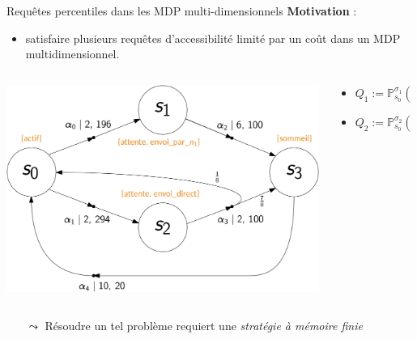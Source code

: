 \documentclass[compress]{beamer}
\begin{document}
\begin{frame}{Requêtes percentiles dans les MDP multi-dimensionnels}
  \textbf{\color{fibeamer@orange}Motivation} :
  \begin{itemize}
    \item satisfaire plusieurs requêtes d'accessibilité limité par un coût dans
      un MDP multidimensionnel.
  \end{itemize}
  \begin{center}
    \begin{columns}
      \begin{column}{0.4\linewidth}
        \includegraphics[width=\linewidth]{resources/mdmdp2}
      \end{column}
      \begin{column}{0.6\linewidth}{\small
        \begin{itemize}
          \item $Q_1 := \mathbb{P}^{\sigma_1}_{s_0}(\Diamond_{1\, :\, \leq 4} \text{ sommeil}) \geq 0.8$
          \item $Q_2 := \mathbb{P}^{\sigma_2}_{s_0}(\Diamond_{2\, :\, \leq 700} \text{ sommeil}) \geq 0.9$
        \end{itemize}
        }
      \end{column}
    \end{columns}
  \end{center}
  \begin{itemize}
    \item[$\leadsto$] Résoudre un tel problème requiert une \textit{\color{fibeamer@orange}stratégie à mémoire finie}
  \end{itemize}
\end{frame}
\end{document}
